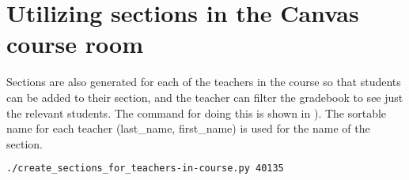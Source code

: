 \section{Utilizing sections in the Canvas course room}
\label{sec:CRUsingSectionc}


Sections are also generated for each of the teachers in the course so that students can be added to their section, and the teacher can filter the gradebook to see just the relevant students. 
 The command for doing this is shown in ). The sortable name for each teacher (\ie last\_name, first\_name) is used for the name of the section.
\begin{lstlisting}[basicstyle=\footnotesize, language={bash}, columns=fullflexible, showstringspaces=false, caption={Create a section for each teacher in the course},label=lst:CRcreatSectionsForTeachers]
./create_sections_for_teachers-in-course.py 40135
\end{lstlisting}
